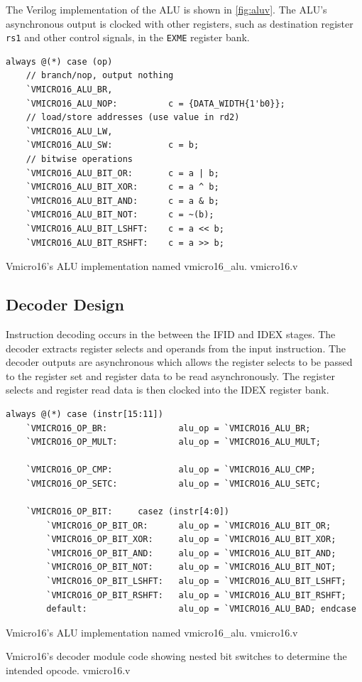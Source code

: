 The Verilog implementation of the ALU is shown in \cref{fig:aluv}. The ALU's asynchronous output is clocked with other registers, such as destination register \verb|rs1| and other control signals, in the \verb|EXME| register bank.
\begin{listing}[H]
\centering
\begin{verbatim}
always @(*) case (op)
    // branch/nop, output nothing
    `VMICRO16_ALU_BR,
    `VMICRO16_ALU_NOP:          c = {DATA_WIDTH{1'b0}};
    // load/store addresses (use value in rd2)
    `VMICRO16_ALU_LW,
    `VMICRO16_ALU_SW:           c = b;
    // bitwise operations
    `VMICRO16_ALU_BIT_OR:       c = a | b;
    `VMICRO16_ALU_BIT_XOR:      c = a ^ b;
    `VMICRO16_ALU_BIT_AND:      c = a & b;
    `VMICRO16_ALU_BIT_NOT:      c = ~(b);
    `VMICRO16_ALU_BIT_LSHFT:    c = a << b;
    `VMICRO16_ALU_BIT_RSHFT:    c = a >> b;
\end{verbatim}
\caption{Vmicro16's ALU implementation named vmicro16\_alu. vmicro16.v}
\label{fig:aluv}
\end{listing}




\subsection{Decoder Design}
Instruction decoding occurs in the between the IFID and IDEX stages. 
The decoder extracts register selects and operands from the input instruction. The decoder outputs are asynchronous which allows the register selects to be passed to the register set and register data to be read asynchronously. The register selects and register read data is then clocked into the IDEX register bank.

\begin{listing}[H]
\centering
\begin{verbatim}
always @(*) case (instr[15:11])
    `VMICRO16_OP_BR:              alu_op = `VMICRO16_ALU_BR;
    `VMICRO16_OP_MULT:            alu_op = `VMICRO16_ALU_MULT;

    `VMICRO16_OP_CMP:             alu_op = `VMICRO16_ALU_CMP;
    `VMICRO16_OP_SETC:            alu_op = `VMICRO16_ALU_SETC;
    
    `VMICRO16_OP_BIT:     casez (instr[4:0])
        `VMICRO16_OP_BIT_OR:      alu_op = `VMICRO16_ALU_BIT_OR;
        `VMICRO16_OP_BIT_XOR:     alu_op = `VMICRO16_ALU_BIT_XOR;
        `VMICRO16_OP_BIT_AND:     alu_op = `VMICRO16_ALU_BIT_AND;
        `VMICRO16_OP_BIT_NOT:     alu_op = `VMICRO16_ALU_BIT_NOT;
        `VMICRO16_OP_BIT_LSHFT:   alu_op = `VMICRO16_ALU_BIT_LSHFT;
        `VMICRO16_OP_BIT_RSHFT:   alu_op = `VMICRO16_ALU_BIT_RSHFT;
        default:                  alu_op = `VMICRO16_ALU_BAD; endcase
\end{verbatim}
\caption{Vmicro16's ALU implementation named vmicro16\_alu. vmicro16.v}
\caption{Vmicro16's decoder module code showing nested bit switches to determine the intended opcode. vmicro16.v}
\label{fig:vdecoder}
\end{listing}


